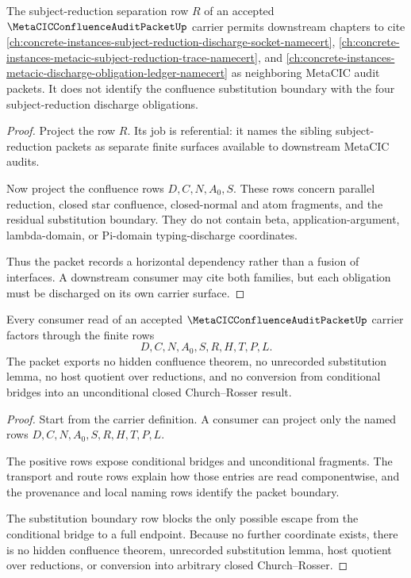 \begin{theorem}
\label{thm:metacic-confluence-audit-packet-subject-reduction-separation}
The subject-reduction separation row $R$ of an accepted
$\MetaCICConfluenceAuditPacketUp$ carrier permits downstream chapters to cite
\autoref{ch:concrete-instances-subject-reduction-discharge-socket-namecert},
\autoref{ch:concrete-instances-metacic-subject-reduction-trace-namecert}, and
\autoref{ch:concrete-instances-metacic-discharge-obligation-ledger-namecert}
as neighboring MetaCIC audit packets. It does not identify the confluence
substitution boundary with the four subject-reduction discharge obligations.
\end{theorem}
\begin{proof}
Project the row $R$. Its job is referential: it names the sibling
subject-reduction packets as separate finite surfaces available to downstream
MetaCIC audits.

Now project the confluence rows $D,C,N,A_0,S$. These rows concern parallel
reduction, closed star confluence, closed-normal and atom fragments, and the
residual substitution boundary. They do not contain beta, application-argument,
lambda-domain, or Pi-domain typing-discharge coordinates.

Thus the packet records a horizontal dependency rather than a fusion of
interfaces. A downstream consumer may cite both families, but each obligation
must be discharged on its own carrier surface.
\end{proof}

\begin{theorem}
\label{thm:metacic-confluence-audit-packet-nonescape}
Every consumer read of an accepted $\MetaCICConfluenceAuditPacketUp$ carrier
factors through the finite rows
$$
D,C,N,A_0,S,R,H,T,P,L.
$$
The packet exports no hidden confluence theorem, no unrecorded substitution
lemma, no host quotient over reductions, and no conversion from conditional
bridges into an unconditional closed Church--Rosser result.
\end{theorem}
\begin{proof}
Start from the carrier definition. A consumer can project only the named rows
$D,C,N,A_0,S,R,H,T,P,L$.

The positive rows expose conditional bridges and unconditional fragments. The
transport and route rows explain how those entries are read componentwise, and
the provenance and local naming rows identify the packet boundary.

The substitution boundary row blocks the only possible escape from the
conditional bridge to a full endpoint. Because no further coordinate exists,
there is no hidden confluence theorem, unrecorded substitution lemma, host
quotient over reductions, or conversion into arbitrary closed Church--Rosser.
\end{proof}

